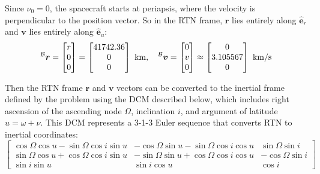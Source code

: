 \documentclass[titlepage]{article}
\begin{document}
Since $\nu_0=0$, the spacecraft starts at periapsis, where the velocity is perpendicular to the position vector. So in the RTN frame, $\boldsymbol{r}$ lies entirely along $\hat{\boldsymbol{e}}_r$ and $\boldsymbol{v}$ lies entirely along $\hat{\boldsymbol{e}}_u$:
\begin{equation}
	\prescript{\mathcal{B}}{}{\boldsymbol{r}}=
	\begin{bmatrix}
		r \\
		0 \\
		0
	\end{bmatrix}=
	\begin{bmatrix}
		41742.36 \\
		0 \\
		0
	\end{bmatrix}\text{ km},\quad
	\prescript{\mathcal{B}}{}{\boldsymbol{v}}=
	\begin{bmatrix}
		0 \\
		v \\
		0
	\end{bmatrix}\approx
	\begin{bmatrix}
		0 \\
		3.105567 \\
		0
	\end{bmatrix}\text{ km/s}
	\label{eq:rtnrv}
\end{equation}

Then the RTN frame $\boldsymbol{r}$ and $\boldsymbol{v}$ vectors can be converted to the inertial frame defined by the problem using the DCM described below, which includes right ascension of the ascending node $\Omega$, inclination $i$, and argument of latitude $u=\omega+\nu$. This DCM represents a 3-1-3 Euler sequence that converts RTN to inertial coordinates:
\begin{equation}
	\left[
	\begin{matrix}
		\cos{\Omega}\cos{u}-\sin{\Omega}\cos{i}\sin{u} & -\cos{\Omega}\sin{u}-\sin{\Omega}\cos{i}\cos{u} & \sin{\Omega}\sin{i}\\
		\sin{\Omega}\cos{u}+\cos{\Omega}\cos{i}\sin{u} & -\sin{\Omega}\sin{u}+\cos{\Omega}\cos{i}\cos{u} & -\cos{\Omega}\sin{i}\\
		\sin{i}\sin{u} & \sin{i}\cos{u} & \cos{i}
	\end{matrix}
	\right]
\end{equation}
\end{document}

